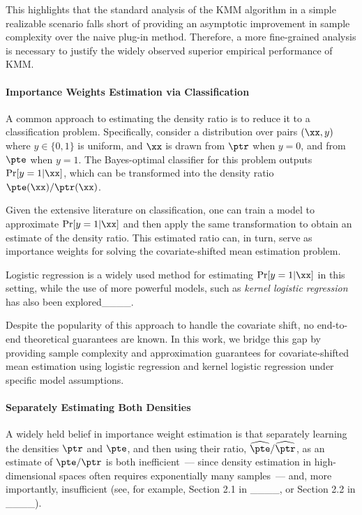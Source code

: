 This highlights that the standard analysis of the KMM algorithm in a simple realizable scenario falls short of providing an asymptotic improvement in sample complexity over the naive plug-in method. Therefore, a more fine-grained analysis is necessary to justify the widely observed superior empirical performance of KMM.

\paragraph{Importance Weights Estimation via Classification}

A common approach to estimating the density ratio is to reduce it to a classification problem. Specifically, consider a distribution over pairs $(\xx, y)$ where $y \in \{ 0, 1\}$ is uniform, 
and $\xx$ is drawn from $\ptr$ when $y=0$, and from $\pte$ when $y=1$. The Bayes-optimal classifier for this problem outputs $\Pr[y=1 | \xx]$, which can be transformed into the density ratio $\pte(\xx)/\ptr(\xx)$.

Given the extensive literature on classification, one can train a model to approximate $\Pr[y=1 | \xx]$ and then apply the same transformation to obtain an estimate of the density ratio. This estimated ratio can, in turn, serve as importance weights for solving the covariate-shifted mean estimation problem.

Logistic regression is a widely used method for estimating $\Pr[y=1 | \xx]$ in this setting, while the use of more powerful models, such as \emph{kernel logistic regression} has also been explored____.  

Despite the popularity of this approach to handle the covariate shift, no end-to-end theoretical guarantees are known. In this work, we bridge this gap by providing sample complexity and approximation guarantees for covariate-shifted mean estimation using logistic regression and kernel logistic regression under specific model assumptions.

\paragraph{Separately Estimating Both Densities}

A widely held belief in importance weight estimation is that separately learning the densities $\ptr$ and $\pte$, and then using their ratio, $\widehat{\pte}/\widehat{\ptr}$, as an estimate of $\pte/\ptr$ is both inefficient~--- since density estimation in high-dimensional spaces often requires exponentially many samples~--- and, more importantly, insufficient (see, for example, Section 2.1 in ____, or Section 2.2 in ____).

